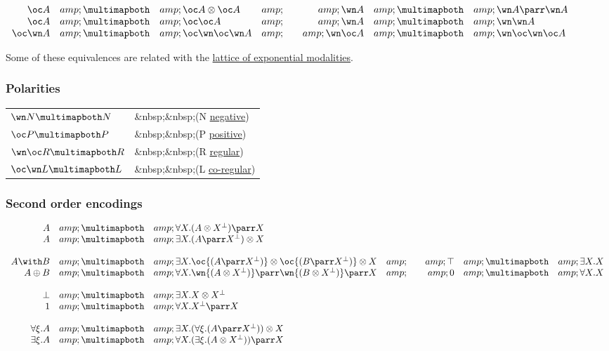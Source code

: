 \(\begin{array}{rclcrcl}
  \oc A &amp;\linequiv&amp; \oc A\tens\oc A &amp;\quad&amp; 
  \wn A &amp;\linequiv&amp; \wn A\parr\wn A\\
  \oc A &amp;\linequiv&amp; \oc\oc A &amp;\quad&amp; \wn A &amp;\linequiv&amp; \wn\wn A\\
  \oc\wn A &amp;\linequiv&amp; \oc\wn\oc\wn A &amp;\quad&amp; \wn\oc A &amp;\linequiv&amp; \wn\oc\wn\oc A\\
\end{array}\)

Some of these equivalences are related with the
\href{lattice_of_exponential_modalities}{lattice of exponential
modalities}.

\subsubsection{Polarities}\label{polarities}

\begin{longtable}[]{@{}ll@{}}
\toprule
\(\wn N \linequiv N\) & \&nbsp;\&nbsp;(N
\href{Negative_formula}{negative})\tabularnewline
\(\oc P \linequiv P\) & \&nbsp;\&nbsp;(P
\href{Positive_formula}{positive})\tabularnewline
\(\wn\oc R \linequiv R\) & \&nbsp;\&nbsp;(R
\href{Regular_formula}{regular})\tabularnewline
\(\oc\wn L \linequiv L\) & \&nbsp;\&nbsp;(L
\href{Co-regular_formula}{co-regular})\tabularnewline
\bottomrule
\end{longtable}

\subsubsection{Second order encodings}\label{second-order-encodings}

\(\begin{array}{rclcrcl}
  A &amp;\linequiv &amp;\forall X . (A \tens X\orth) \parr X \\
  A &amp;\linequiv &amp;\exists X . (A \parr X\orth) \tens X \\
\\
  A \with B &amp;\linequiv&amp; \exists X . \oc{(A \parr X\orth)} \tens \oc{(B \parr X\orth)} \tens X &amp;\quad&amp; \top &amp;\linequiv&amp; \exists X . X \\
  A \plus B &amp;\linequiv&amp; \forall X . \wn{(A \tens X\orth)} \parr \wn{(B \tens X\orth)} \parr X &amp;\quad&amp; \zero &amp;\linequiv&amp; \forall X . X \\
\\
 \bot &amp;\linequiv&amp; \exists X . X\tens X\orth \\
 \one &amp;\linequiv&amp; \forall X . X\orth\parr X \\
\\
  \forall \xi . A &amp;\linequiv&amp; \exists X . (\forall \xi . (A \parr X\orth)) \tens X \\
  \exists \xi . A &amp;\linequiv&amp; \forall X . (\exists \xi . (A \tens X\orth)) \parr X
\end{array}\)

